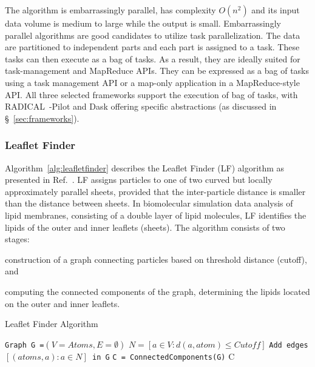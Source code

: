 The algorithm is embarrassingly parallel, has complexity $O(n^2)$ and its input data volume is medium to large while the output is small.
Embarrassingly parallel algorithms are good candidates to utilize task parallelization.
The data are partitioned to independent parts and each part is assigned to a task.
These tasks can then execute as a bag of tasks.
As a result, they are ideally suited for task-management and MapReduce APIs.
They can be expressed as a bag of tasks using a task management API or a map-only application in a MapReduce-style API.
All three selected frameworks support the execution of bag of tasks, with RADICAL~-Pilot and Dask offering specific abstractions (as discussed in \S~\ref{sec:frameworks}).

\subsubsection*{Leaflet Finder}Algorithm~\ref{alg:leafletfinder} describes the Leaflet Finder (LF) algorithm as presented in Ref.~\cite{michaud2011mdanalysis}.
LF assigns particles to one of two curved but locally approximately parallel sheets, provided that the inter-particle distance is smaller than the distance between sheets.
In biomolecular simulation data analysis of lipid membranes, consisting of a double layer of lipid molecules, LF identifies the lipids of the outer and inner leaflets (sheets).
The algorithm consists of two stages:
\begin{inparaenum}[a)]
    \item construction of a graph connecting particles based on threshold distance (cutoff), and
    \item computing the connected components of the graph, determining the lipids located on the outer and inner leaflets.
\end{inparaenum}

\begin{algorithm}[t]
    \scriptsize
    \caption{Leaflet Finder Algorithm}
    \label{alg:leafletfinder}
    \begin{algorithmic}[1]
        \State \texttt{Graph G =$(V=Atoms,E=\emptyset)$}
        \State \texttt{$N = [a\in V: d(a,atom)\le Cutoff]$}
        \State \texttt{Add edges $[(atoms,a): a \in N]$ in G}
        \EndFor
        \State \texttt{C = ConnectedComponents(G)}
        \State \Return C
        \EndProcedure
    \end{algorithmic}
\end{algorithm}

